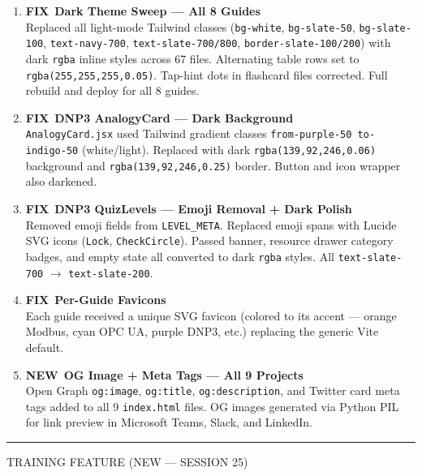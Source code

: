 \documentclass[10pt]{article}
\newcommand{\feat}{\textcolor{sgreen}{\small\bfseries NEW}}
\newcommand{\fix}{\textcolor{sblue}{\small\bfseries FIX}}
\begin{document}
\begin{enumerate}[resume]\small
  \item \fix\ \textbf{Dark Theme Sweep — All 8 Guides} \\
    Replaced all light-mode Tailwind classes (\texttt{bg-white}, \texttt{bg-slate-50}, \texttt{bg-slate-100}, \texttt{text-navy-700}, \texttt{text-slate-700/800}, \texttt{border-slate-100/200}) with dark \texttt{rgba} inline styles across 67 files. Alternating table rows set to \texttt{rgba(255,255,255,0.05)}. Tap-hint dots in flashcard files corrected. Full rebuild and deploy for all 8 guides.

  \item \fix\ \textbf{DNP3 AnalogyCard — Dark Background} \\
    \texttt{AnalogyCard.jsx} used Tailwind gradient classes \texttt{from-purple-50 to-indigo-50} (white/light). Replaced with dark \texttt{rgba(139,92,246,0.06)} background and \texttt{rgba(139,92,246,0.25)} border. Button and icon wrapper also darkened.

  \item \fix\ \textbf{DNP3 QuizLevels — Emoji Removal + Dark Polish} \\
    Removed emoji fields from \texttt{LEVEL\_META}. Replaced emoji spans with Lucide SVG icons (\texttt{Lock}, \texttt{CheckCircle}). Passed banner, resource drawer category badges, and empty state all converted to dark \texttt{rgba} styles. All \texttt{text-slate-700} $\to$ \texttt{text-slate-200}.

  \item \fix\ \textbf{Per-Guide Favicons} \\
    Each guide received a unique SVG favicon (colored to its accent — orange Modbus, cyan OPC UA, purple DNP3, etc.) replacing the generic Vite default.

  \item \feat\ \textbf{OG Image + Meta Tags — All 9 Projects} \\
    Open Graph \texttt{og:image}, \texttt{og:title}, \texttt{og:description}, and Twitter card meta tags added to all 9 \texttt{index.html} files. OG images generated via Python PIL for link preview in Microsoft Teams, Slack, and LinkedIn.
\end{enumerate}

\smallskip
{\color{snavy}\rule{\linewidth}{0.4pt}}
\smallskip

{\small\sffamily\color{sgray}\MakeUppercase{Training Feature (New — Session 25)}}
\smallskip
\end{document}
